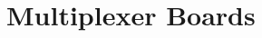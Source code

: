 \documentclass[../../main]{subfiles}
\begin{document}
\section{Multiplexer Boards} \label{sec:}
\end{document}
